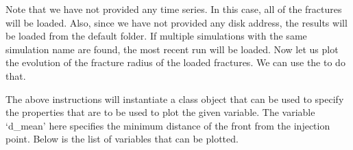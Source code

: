 \documentclass[letterpaper,10pt,english]{sphinxmanual}
\begin{document}
\sphinxAtStartPar
Note that we have not provided any time series. In this case, all of the fractures will be loaded. Also, since we have not provided any disk address, the results will be loaded from the default folder. If multiple simulations with the same simulation name are found, the most recent run will be loaded. Now let us plot the evolution of the fracture radius of the loaded fractures. We can use the  to do that.

\begin{sphinxVerbatim}[commandchars=\\\{\}]
   
   

   
  
\end{sphinxVerbatim}

\sphinxAtStartPar
The above instructions will instantiate a  class object that can be used to specify the properties that are to be used to plot the given variable. The variable ‘d\_mean’ here specifies the minimum distance of the front from the injection point. Below is the list of variables that can be plotted.
\end{document}
